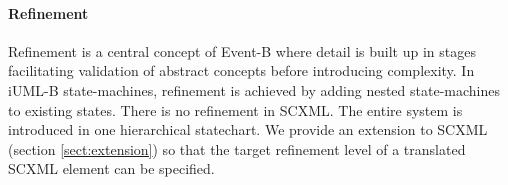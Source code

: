 
\paragraph{Refinement}
Refinement is a central concept of Event-B where detail is built up in stages facilitating validation of abstract concepts before introducing complexity. 
In iUML-B state-machines, refinement is achieved by adding nested state-machines to existing states.
There is no refinement in SCXML. The entire system is introduced in one hierarchical statechart. We provide an extension to SCXML (section \ref{sect:extension}) so that the target refinement level of a translated SCXML element can be specified.



%
%

